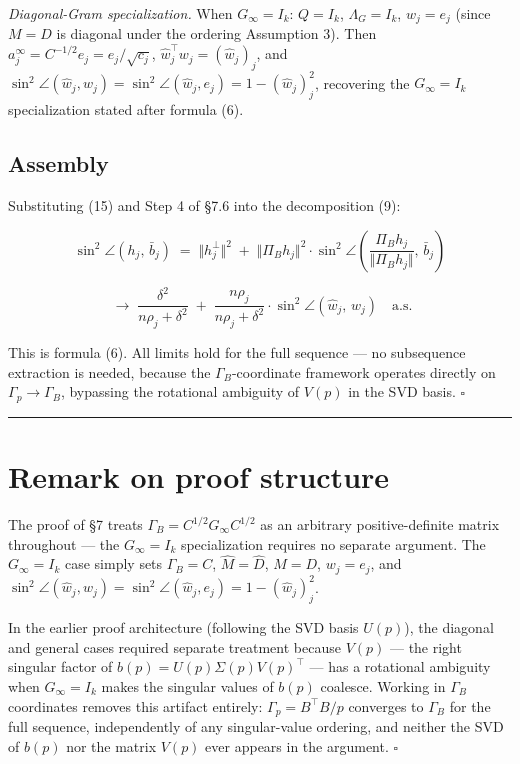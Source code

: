 \documentclass{article}
\theoremstyle{remark}
\begin{document}
\textit{Diagonal-Gram specialization.} When $G_\infty = I_k$: $Q = I_k$, $\Lambda_G = I_k$, $w_j = e_j$ (since $M = D$ is diagonal under the ordering Assumption 3). Then $a_j^\infty = C^{-1/2}e_j = e_j/\sqrt{c_j}$, $\hat{w}_j^\top w_j = (\hat{w}_j)_j$, and $\sin^2\angle(\hat{w}_j, w_j) = \sin^2\angle(\hat{w}_j, e_j) = 1 - (\hat{w}_j)_j^2$, recovering the $G_\infty = I_k$ specialization stated after formula (6).

\subsection{Assembly}

Substituting (15) and Step 4 of §7.6 into the decomposition (9):

\[
\sin^2\angle(h_j,\,\bar{b}_j) \;=\; \Vert h_j^\perp\Vert^2 \;+\; \Vert \Pi_B h_j\Vert^2\cdot\sin^2\!\angle\!\left(\frac{\Pi_B h_j}{\Vert \Pi_B h_j\Vert },\,\bar{b}_j\right)
\]

\[
\;\longrightarrow\; \frac{\delta^2}{n\rho_j+\delta^2} \;+\; \frac{n\rho_j}{n\rho_j+\delta^2}\cdot\sin^2\!\angle(\hat{w}_j,\,w_j) \quad\text{a.s.}
\]

This is formula (6). All limits hold for the full sequence — no subsequence extraction is needed, because the $\Gamma_B$-coordinate framework operates directly on $\Gamma_p \to \Gamma_B$, bypassing the rotational ambiguity of $V(p)$ in the SVD basis. $\square$

\medskip\noindent\rule{\linewidth}{0.4pt}\medskip

\section{Remark on proof structure}

The proof of §7 treats $\Gamma_B = C^{1/2}G_\infty C^{1/2}$ as an arbitrary positive-definite matrix throughout — the $G_\infty = I_k$ specialization requires no separate argument. The $G_\infty = I_k$ case simply sets $\Gamma_B = C$, $\hat{M} = \hat{D}$, $M = D$, $w_j = e_j$, and $\sin^2\angle(\hat{w}_j, w_j) = \sin^2\angle(\hat{w}_j, e_j) = 1 - (\hat{w}_j)_j^2$.

In the earlier proof architecture (following the SVD basis $U(p)$), the diagonal and general cases required separate treatment because $V(p)$ — the right singular factor of $b(p) = U(p)\Sigma(p)V(p)^\top$ — has a rotational ambiguity when $G_\infty = I_k$ makes the singular values of $b(p)$ coalesce. Working in $\Gamma_B$ coordinates removes this artifact entirely: $\Gamma_p = B^\top B/p$ converges to $\Gamma_B$ for the full sequence, independently of any singular-value ordering, and neither the SVD of $b(p)$ nor the matrix $V(p)$ ever appears in the argument. $\square$
\end{document}
